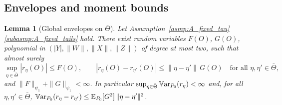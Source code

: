 \documentclass[11pt]{article}
\newtheorem{lemma}{Lemma}
\theoremstyle{definition}
\theoremstyle{plain}
\newcommand{\E}{\mathbb{E}}
\newcommand{\Var}{\mathbb{V}{\rm ar}}
\begin{document}
\subsection{Envelopes and moment bounds}

\begin{lemma}[Global envelopes on $\bar\Theta$]
\label{lem:subexp_fixed_tau_new}
Let Assumption~\ref{asmp:A_fixed_tau}\ref{subasmp:A_fixed_tails} hold. There exist random variables $F(O)$, $G(O)$, polynomial in $(|Y|,\|W\|,\|X\|,\|Z\|)$ of degree at most two, such that almost surely
\[
\sup_{\eta\in\bar\Theta}|r_\eta(O)|\le F(O),\qquad
|r_\eta(O)-r_{\eta'}(O)|\le\|\eta-\eta'\|\,G(O)\quad\text{for all }\eta,\eta'\in\bar\Theta,
\]
and $\|F\|_{\psi_1}+\|G\|_{\psi_1}<\infty$. In particular $\sup_{\eta\in\bar\Theta}\Var_{P_0}(r_\eta)<\infty$ and, for all $\eta,\eta'\in\bar\Theta$,
$\Var_{P_0}(r_\eta-r_{\eta'})\le\E_{P_0}[G^2]\,\|\eta-\eta'\|^2$.
\end{lemma}
\end{document}
